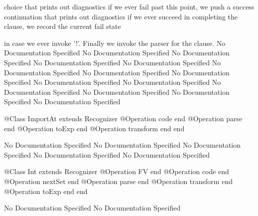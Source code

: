           choice that prints out diagnostics if we ever fail past this point,
          we push a success continuation that prints out diagnostics if we ever 
          succeed in completing the clause, we record the current fail state

          in case we ever invoke '!'. Finally we invoke the parser for the clause.
No Documentation Specified
No Documentation Specified
No Documentation Specified
No Documentation Specified
No Documentation Specified
No Documentation Specified
No Documentation Specified
No Documentation Specified
No Documentation Specified
No Documentation Specified
No Documentation Specified
No Documentation Specified
No Documentation Specified
No Documentation Specified
\begin{Interface}
@Class ImportAt extends Recognizer
  @Operation code end
  @Operation parse end
  @Operation toExp end
  @Operation transform end
end
\end{Interface}
No Documentation Specified
No Documentation Specified
No Documentation Specified
No Documentation Specified
No Documentation Specified
\begin{Interface}
@Class Int extends Recognizer
  @Operation FV end
  @Operation code end
  @Operation nextSet end
  @Operation parse end
  @Operation transform end
  @Operation toExp end
end
\end{Interface}
No Documentation Specified
No Documentation Specified
